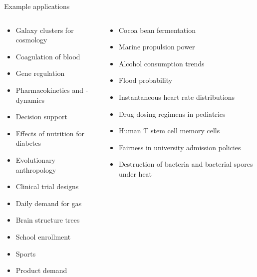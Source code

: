 \documentclass[10pt]{beamer}
\begin{document}
\begin{frame}{Example applications}

  \begin{columns}[T] %
 \begin{column}{.49\textwidth}
{  \footnotesize
  \begin{itemize}
 \item Galaxy clusters for cosmology
 \item Coagulation of blood
 \item Gene regulation
 \item Pharmacokinetics and -dynamics
 \item Decision support
 \item Effects of nutrition for diabetes
 \item Evolutionary anthropology
 \item Clinical trial designs
 \item Daily demand for gas
 \item Brain structure trees
 \item School enrollment
 \item Sports
 \item Product demand
 \end{itemize}
 }
\end{column}
 \begin{column}{.49\textwidth}
{    \footnotesize
  \begin{itemize}
 \item Cocoa bean fermentation
 \item Marine propulsion power
 \item Alcohol consumption trends
 \item Flood probability
 \item Instantaneous heart rate distributions
 \item Drug dosing regimens in pediatrics
 \item Human T stem cell memory cells
 \item Fairness in university admission policies
 \item Destruction of bacteria and bacterial spores under heat
 \end{itemize}
 }
\end{column}
\end{columns}
\end{frame}
\end{document}
